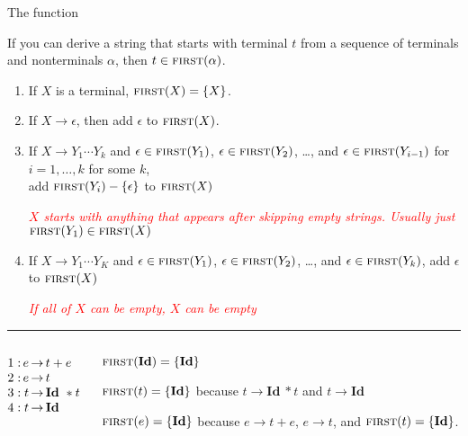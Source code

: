 \documentclass{plt}
\makeatletter
\newcommand{\id}{\textbf{Id}}
\newcommand{\grammarone}{
\renewcommand{\arraystretch}{1}
$\begin{array}[t]{@{}l@{\,}r@{\,}c@{\,}l@{}}
1: & e & \rightarrow & t + e \\
2: & e & \rightarrow & t \\
3: & t & \rightarrow & \id\ * t \\
4: & t & \rightarrow & \id
\end{array}$
}
\makeatother
\begin{document}
\begin{frame}{The \first{} function}

\parskip=5pt

If you can derive a string that starts with terminal $t$ from a
sequence of terminals and nonterminals $\alpha$, then $t \in
\textsc{first}(\alpha)$.

\begin{enumerate}
\item If $X$ is a terminal, $\textsc{first}(X) = \{ X \}$.

\item If $X \rightarrow \epsilon$, then add $\epsilon$ to $\textsc{first}(X)$.

\item If $X \rightarrow Y_1 \cdots Y_k$ and
  $\epsilon \in \textsc{first}(Y_1)$,
  $\epsilon \in \textsc{first}(Y_2)$, \ldots, and $\epsilon \in
  \textsc{first}(Y_{i-1})$ for $i=1,\ldots, k$ for some $k$, \\ \quad add
  $\textsc{first}(Y_i) - \{ \epsilon \}$ to $\textsc{first}(X)$

    \textcolor{red}{\emph{$X$ starts with anything that appears after
      skipping empty strings. Usually just $\textsc{first}(Y_1) \in \textsc{first}(X)$}}

\item If $X \rightarrow Y_1 \cdots Y_K$ and
  $\epsilon \in \textsc{first}(Y_1)$,
  $\epsilon \in \textsc{first}(Y_2)$, \ldots, and $\epsilon \in \textsc{first}(Y_k)$, add
  $\epsilon$ to $\textsc{first}(X)$

    \textcolor{red}{\emph{If all of $X$ can be empty, $X$ can be empty}}  
\end{enumerate}

\hrule

\vspace{5pt}

\begin{columns}
\begin{column}{0.3\textwidth}
\grammarone
\end{column}
\begin{column}{0.7\textwidth}
\parskip=5pt
$\first(\id) = \{ \id \}$

$\first(t) = \{ \id \}$ because $t \rightarrow \id\ * t$ and $t
  \rightarrow \id$

$\first(e) = \{ \id \}$ because $e \rightarrow t + e$, $e \rightarrow
  t$, and $\first(t) = \{ \id \}$.

\end{column}
\end{columns}

\end{frame}
\end{document}
